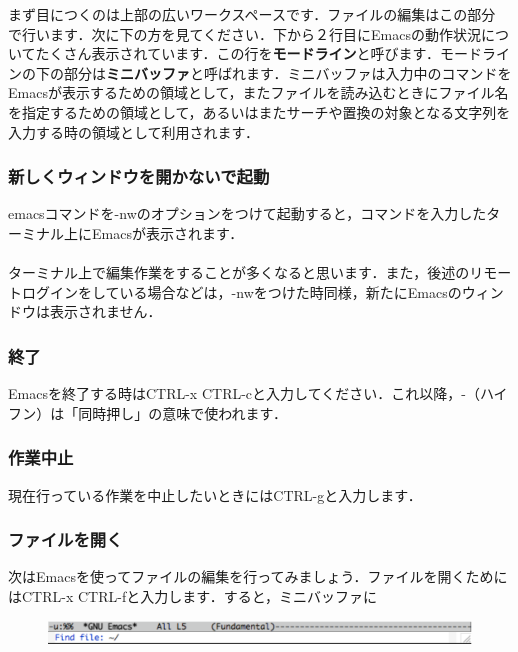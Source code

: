 \documentclass{jarticle}
\begin{document}
まず目につくのは上部の広いワークスペースです．ファイルの編集はこの部分
で行います．次に下の方を見てください．下から２行目にEmacsの動作状況につ
いてたくさん表示されています．この行を{\bf モードライン}と呼びます．モードライ
ンの下の部分は{\bf ミニバッファ}と呼ばれます．ミニバッファは入力中のコマンドを
Emacsが表示するための領域として，またファイルを読み込むときにファイル名
を指定するための領域として，あるいはまたサーチや置換の対象となる文字列を
入力する時の領域として利用されます．

\subsubsection{新しくウィンドウを開かないで起動}
emacsコマンドを-nwのオプションをつけて起動すると，コマンドを入力したターミナル上にEmacsが表示されます．\\
\quad \quad {}\\
ターミナル上で編集作業をすることが多くなると思います．また，後述のリモートログインをしている場合などは，-nwをつけた時同様，新たにEmacsのウィンドウは表示されません．


\subsubsection{終了}
Emacsを終了する時はCTRL-x CTRL-cと入力してください．これ以降，-（ハイフン）は「同時押し」の意味で使われます．

\subsubsection{作業中止}
現在行っている作業を中止したいときにはCTRL-gと入力します．

\subsubsection{ファイルを開く}
次はEmacsを使ってファイルの編集を行ってみましょう．ファイルを開くために
はCTRL-x CTRL-fと入力します．すると，ミニバッファに

\begin{figure}[ht]
  \begin{center}
    \includegraphics[width=130mm,pagebox=cropbox,clip]{fig/emacs002.pdf}
  \end{center}
\end{figure}
\end{document}
